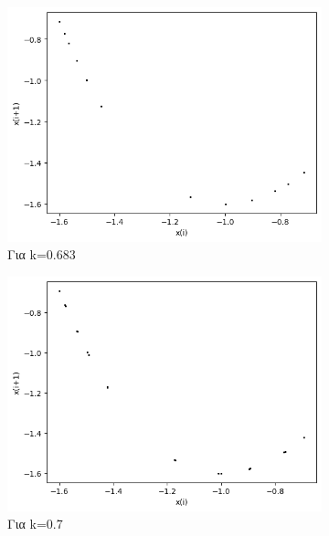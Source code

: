 \begin{figure}[h!]
	\centering
	
	\begin{subfigure}[b]{0.4\textwidth}
		\centering
		\includegraphics[width=\textwidth]{LateX images/graphs q16/g13}
		\caption{Για k=0.683}
		\label{f:k84}
	\end{subfigure}
	\hfill
	\begin{subfigure}[b]{0.4\textwidth}
		\centering
		\includegraphics[width=\textwidth]{LateX images/graphs q16/g14}
		\caption{Για k=0.7}
		\label{f:k85}
	\end{subfigure}
	\hfill
	\begin{subfigure}[b]{0.4\textwidth}
		\centering

\end{subfigure}
\end{figure}
